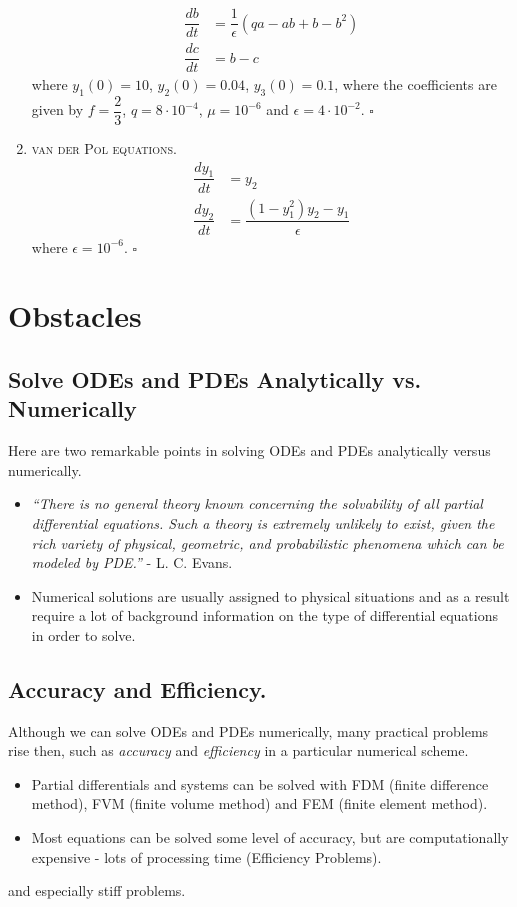 \documentclass[a4paper,oneside]{book}
\numberwithin{equation}{chapter}
\begin{document}
\begin{enumerate}
\begin{align}
    \\
    \dfrac{db}{dt}  &=  \dfrac{1}{\epsilon} \left(qa -ab + b - b^2\right)
    \\
    \dfrac{dc}{dt}  &=  b-c
\end{align}
where $y_1\left(0\right) = 10$, $y_2\left(0\right) = 0.04$, $y_3\left(0\right) = 0.1$, where the coefficients are given by $f = \dfrac{2}{3}$, $q = 8\cdot 10^{-4}$, $\mu=10^{-6}$ and $\epsilon = 4\cdot 10^{-2}$. \hfill $\square$
\item \textsc{van der Pol equations.} 
\begin{align}
    \dfrac{dy_1}{dt}  &=  y_2
    \\
    \dfrac{dy_2}{dt}  &=  \dfrac{\left(1-y_1^2\right)y_2 - y_1}{\epsilon}
\end{align}
where $\epsilon = 10^{-6}$. \hfill $\square$
\end{enumerate}
\section{Obstacles}
\subsection{Solve ODEs and PDEs Analytically vs. Numerically}
Here are two remarkable points in solving ODEs and PDEs analytically versus numerically.
\begin{itemize}
\item \textit{``There is no general theory known concerning the solvability of all partial differential equations. Such a theory is extremely unlikely to exist, given the rich variety of physical, geometric, and probabilistic  phenomena which can be modeled by PDE.''} - L. C. Evans.
\item Numerical solutions are usually assigned to physical situations and as a result require a lot of background information on the type of differential equations in order to solve.
\end{itemize}
\subsection{Accuracy and Efficiency.}
Although we can solve ODEs and PDEs numerically, many practical problems rise then, such as \textit{accuracy} and \textit{efficiency} in a particular numerical scheme.
\begin{itemize}
\item Partial differentials and systems can be solved with FDM (finite difference method), FVM (finite volume method) and FEM (finite element method).
\item Most equations can be solved some level of accuracy, but are computationally expensive - lots of processing time (Efficiency Problems).
\end{itemize}
and especially stiff problems.
\end{document}
